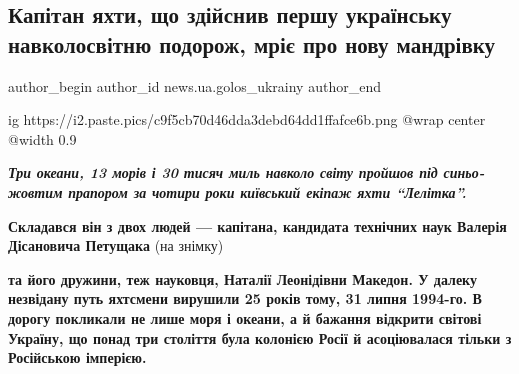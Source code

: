  
 
 
 
 
 
\subsection{Капітан яхти, що здійснив першу українську навколосвітню подорож, мріє про нову мандрівку}
\label{sec:03_08_2019.stz.news.ua.golos_ukrainy.1.kapitan_jahty_mrie_pro_novu_mandrivku}
 
\ifcmt
 author_begin
   author_id news.ua.golos_ukrainy
 author_end
\fi

\ifcmt
  ig https://i2.paste.pics/c9f5cb70d46dda3debd64dd1ffafce6b.png
  @wrap center
  @width 0.9
\fi

\begin{center}
  \em\color{blue}\bfseries\Large
	Три океани, 13 морів і 30 тисяч миль навколо світу пройшов під синьо-жовтим
				прапором за чотири роки київський екіпаж яхти \enquote{Лелітка}.
\end{center}


\textbf{Складався він з двох людей — капітана, кандидата технічних наук Валерія Дісановича Петущака} (на знімку)


\textbf{та його дружини, теж науковця, Наталії Леонідівни Македон. У далеку незвідану
путь яхтсмени вирушили 25 років тому, 31 липня 1994-го. В дорогу покликали не
лише моря і океани, а й бажання відкрити світові Україну, що понад три століття
була колонією Росії й асоціювалася тільки з Російською імперією.}

